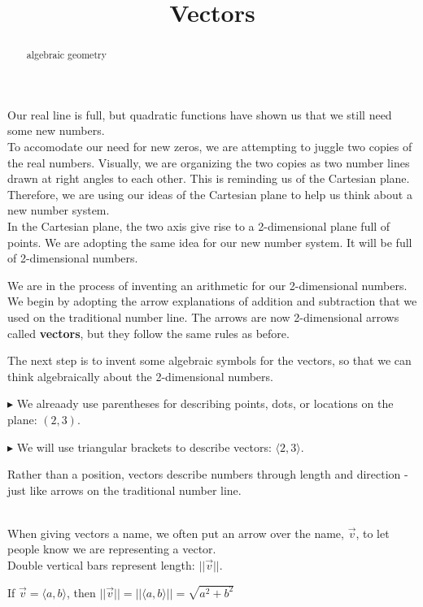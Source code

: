 \documentclass{ximera}
\title{Vectors}
\begin{document}
\begin{abstract}
algebraic geometry
\end{abstract}
\maketitle






Our real line is full, but quadratic functions have shown us that we still need some new numbers.  \\

To accomodate our need for new zeros, we are attempting to juggle two copies of the real numbers. Visually, we are organizing the two copies as two number lines drawn at right angles to each other.  This is reminding us of the Cartesian plane.  Therefore, we are using our ideas of the Cartesian plane to help us think about a new number system.  \\



In the Cartesian plane, the two axis give rise to a 2-dimensional plane full of points.  We are adopting the same idea for our new number system.  It will be full of 2-dimensional numbers.


We are in the process of inventing an arithmetic for our 2-dimensional numbers.  We begin by adopting the arrow explanations of addition and subtraction that we used on the traditional number line. The arrows are now 2-dimensional arrows called \textbf{vectors}, but they follow the same rules as before.

The next step is to invent some algebraic symbols for the vectors, so that we can think algebraically about the 2-dimensional numbers.


$\blacktriangleright$ We alreaady use parentheses for describing points, dots, or locations on the plane: $(2, 3)$.


$\blacktriangleright$ We will use triangular brackets to describe vectors: $\langle 2, 3 \rangle$.  

Rather than a position, vectors describe numbers through length and direction - just like arrows on the traditional number line. 



\begin{notation}   \\


When giving vectors a name, we often put an arrow over the name, $\vec{v}$, to let people know we are representing a vector. \\

Double vertical bars represent length: $|| \vec{v} ||$.

If $\vec{v} = \langle a, b \rangle$, then $|| \vec{v} || = || \langle a, b \rangle || = \sqrt{a^2 + b^2}$

\end{notation}
\end{document}
